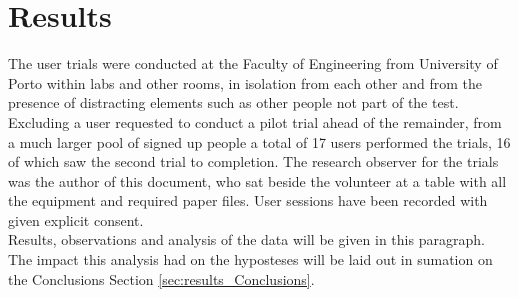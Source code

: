 \chapter{Results} \label{chap:results}

    The user trials were conducted at the Faculty of Engineering from University of Porto within labs and other rooms, in isolation from each other and from the presence of distracting elements such as other people not part of the test. Excluding a user requested to conduct a pilot trial ahead of the remainder, from a much larger pool of signed up people a total of 17 users performed the trials, 16 of which saw the second trial to completion. The research observer for the trials was the author of this document, who sat beside the volunteer at a table with all the equipment and required paper files. User sessions have been recorded with given explicit consent.\\
    Results, observations and analysis of the data will be given in this paragraph. The impact this analysis had on the hyposteses will be laid out in sumation on the Conclusions Section \ref{sec:results_Conclusions}.





